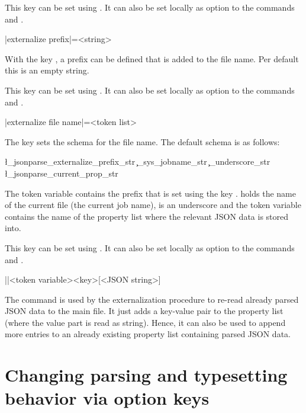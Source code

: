 \documentclass[a4paper]{article}
\begin{document}
{{This key can be set using \macro{\JSONParseSet}. It can also be set locally as option to the commands \macro{\JSONParse} and \macro{\JSONParseFromFile}.

\begin{macrodef}
|externalize prefix|={<string>}
\end{macrodef}
With the key , a prefix can be defined that is added to the file name. Per default this is an empty string.

This key can be set using \macro{\JSONParseSet}. It can also be set locally as option to the commands \macro{\JSONParse} and \macro{\JSONParseFromFile}.

\begin{macrodef}
|externalize file name|={<token list>}
\end{macrodef}
The key  sets the schema for the file name. The default schema is as follows:

\begin{codeexample}
\l_jsonparse_externalize_prefix_str \c_sys_jobname_str
  \c_underscore_str \l_jsonparse_current_prop_str
\end{codeexample}

The token variable  contains the prefix that is set using the key .  holds the name of the current file (the current job name),  is an underscore and the token variable  contains the name of the property list where the relevant JSON data is stored into.

This key can be set using \macro{\JSONParseSet}. It can also be set locally as option to the commands \macro{\JSONParse} and \macro{\JSONParseFromFile}.

\begin{macrodef}
|\JSONParsePut|{<token variable>}{<key>}[<JSON string>]
\end{macrodef}
The command \macro{\JSONParsePut} is used by the externalization procedure to re-read already parsed JSON data to the main file. It just adds a key-value pair to the property list (where the value part is read as string). Hence, it can also be used to append more entries to an already existing property list containing parsed JSON data.

\section{Changing parsing and typesetting behavior via option keys}\label{sec:options}

}}
\end{document}
